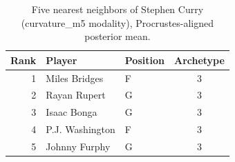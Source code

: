\begin{table}[htbp]
  \centering\small
  \begin{tabular}{rllc}
    \toprule
    Rank & Player & Position & Archetype \\
    \midrule
    1 & Miles Bridges & F & 3 \\
    2 & Rayan Rupert & G & 3 \\
    3 & Isaac Bonga & G & 3 \\
    4 & P.J. Washington & F & 3 \\
    5 & Johnny Furphy & G & 3 \\
    \bottomrule
  \end{tabular}
  \caption{Five nearest neighbors of Stephen Curry (curvature_m5 modality), Procrustes-aligned posterior mean.}
  \label{tab:Stephen_Curry_neighbors_curvature_m5}
\end{table}

